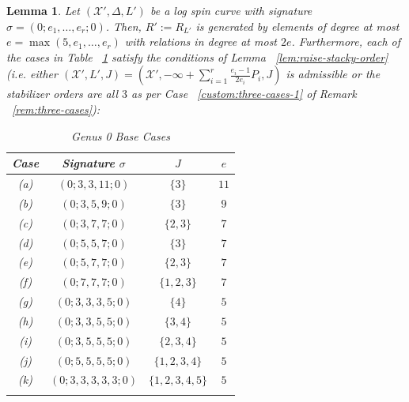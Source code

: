 \documentclass{amsart}
\theoremstyle{plain}
\newtheorem{lem}[thm]{Lemma}
\theoremstyle{definition}
\theoremstyle{remark}
\numberwithin{equation}{section}
\newcommand\sx{\mathscr X}
\newcommand \subhalf[1]{\frac{{#1} - 1}{2{#1}}}
\newcommand{\halfcan}{L}
\DeclareMathOperator{\initial}{in_\prec}
\begin{document}
\begin{lem}
\label{lem:g-0-admissible-cases}
Let $(\sx', \Delta, \halfcan')$ be a log spin curve with signature
$\sigma = (0; e_1, \ldots, e_r; 0)$. Then, $R' := R_{\halfcan'}$ is
generated by elements of degree at most $e = \max(5 , e_1, \ldots,
e_r)$ with relations in degree at most $2e$. Furthermore, each of
the cases in Table ~\ref{table:g-0-base-cases} satisfy the
conditions of Lemma ~\ref{lem:raise-stacky-order} (i.e. either $(\sx',
\halfcan', J) = (\sx', -\infty + \sum_{i = 1}^{r} \subhalf{e_i}
P_i, J)$ is admissible or the stabilizer orders are all $3$ as per
Case ~\ref{custom:three-cases-1} of Remark ~\ref{rem:three-cases}):
 
\rm{
\begin{longtable}
	{| c || c | c | c |}
	\hline
	Case & Signature $\sigma$ & $J$ & $e$\\
	\hline
	\hline

	(a) & $(0; 3, 3, 11; 0)$ & $\{3\}$ & $11$ \\	\hline

	(b) & $(0; 3, 5, 9; 0)$ & $\{3\}$	& $9$ \\ \hline

	(c) & $(0; 3, 7, 7; 0)$ & $\{2, 3\}$ & $7$ \\ \hline

	(d) & $(0; 5, 5, 7; 0)$ & $\{3\}$	& $7$ \\ \hline
	
	(e) & $(0; 5, 7, 7; 0)$ & $\{2, 3\}$ & $7$ \\ \hline
	
	(f) & $(0; 7, 7, 7; 0)$ & $\{1, 2, 3\}$	& $7$ \\ \hline

	(g) & $(0; 3, 3, 3, 5; 0)$ & $\{4\}$ & $5$ \\ \hline
	
	(h) & $(0; 3, 3, 5, 5; 0)$ & $\{3, 4\}$ & $5$ \\ \hline
	
	(i) & $(0; 3, 5, 5, 5; 0)$ & $\{2, 3, 4\}$ & $5$ \\ \hline
	
	(j) & $(0; 5, 5, 5, 5; 0)$ & $\{1, 2, 3, 4\}$ & $5$ \\ \hline

	(k) &	$(0; 3, 3, 3, 3, 3; 0)$ & $\{1, 2, 3, 4, 5\}$ & $5$ \\ \hline
	
	\caption{Genus 0 Base Cases}
	\label{table:g-0-base-cases}
\end{longtable}
}

\end{lem}
\end{document}
